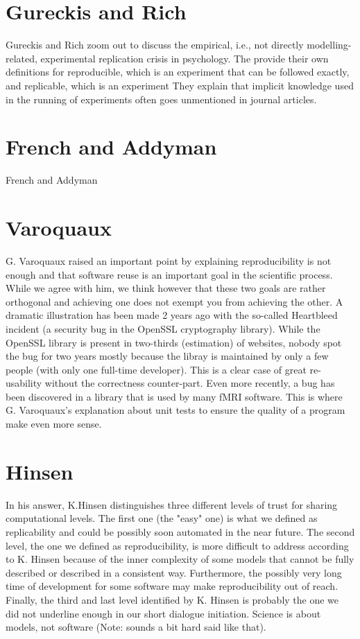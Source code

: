 \documentclass[jou]{apa6}
\begin{document}
\section{Gureckis and Rich}
Gureckis and Rich zoom out to discuss the empirical, i.e., not directly modelling-related, experimental replication crisis in psychology. The provide their own definitions for reproducible, which is an experiment that can be followed exactly, and replicable, which is an experiment They explain that implicit knowledge used in the running of experiments often goes unmentioned in journal articles. 

\section{French and Addyman}
French and Addyman



\section{Varoquaux}
G. Varoquaux raised an important point by explaining reproducibility is not
enough and that software reuse is an important goal in the scientific
process. While we agree with him, we think however that these two goals are
rather orthogonal and achieving one does not exempt you from achieving the
other. A dramatic illustration has been made 2 years ago with the so-called
Heartbleed incident (a security bug in the OpenSSL cryptography library). While
the OpenSSL library is present in two-thirds (estimation) of websites, nobody
spot the bug for two years mostly because the libray is maintained by only a
few people (with only one full-time developer). This is a clear case of great
re-usability without the correctness counter-part. Even more recently, a bug
has been discovered in a library that is used by many fMRI software. This is
where G. Varoquaux's explanation about unit tests to ensure the quality of a
program make even more sense.

\section{Hinsen}
In his answer, K.Hinsen distinguishes three different levels of trust for
sharing computational levels. The first one (the "easy" one) is what we defined
as replicability and could be possibly soon automated in the near future. The
second level, the one we defined as reproducibility, is more difficult to
address according to K. Hinsen because of the inner complexity of some models
that cannot be fully described or described in a consistent way. Furthermore,
the possibly very long time of development for some software may make
reproducibility out of reach. Finally, the third and last level identified by
K. Hinsen is probably the one we did not underline enough in our short dialogue
initiation. Science is about models, not software (Note: sounds a bit hard said
like that).
\end{document}
